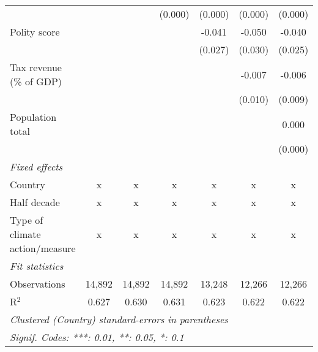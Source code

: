 \begin{tabular}{lcccccc}
                                                                          &              &               & (0.000)        & (0.000)        & (0.000)        & (0.000)\\   
   Polity score                                                           &              &               &                & -0.041         & -0.050         & -0.040\\   
                                                                          &              &               &                & (0.027)        & (0.030)        & (0.025)\\   
   Tax revenue (\% of GDP)                                                &              &               &                &                & -0.007         & -0.006\\   
                                                                          &              &               &                &                & (0.010)        & (0.009)\\   
   Population total                                                       &              &               &                &                &                & 0.000\\   
                                                                          &              &               &                &                &                & (0.000)\\   
   \emph{Fixed effects}\\
   Country                                                                & x            & x             & x              & x              & x              & x\\  
   Half decade                                                            & x            & x             & x              & x              & x              & x\\  
   Type of climate action/measure                                         & x            & x             & x              & x              & x              & x\\  
   \midrule \emph{Fit statistics}\\
   Observations                                                           & 14,892       & 14,892        & 14,892         & 13,248         & 12,266         & 12,266\\  
   R$^2$                                                                  & 0.627        & 0.630         & 0.631          & 0.623          & 0.622          & 0.622\\  
   \midrule
   \multicolumn{7}{l}{\emph{Clustered (Country) standard-errors in parentheses}}\\
   \multicolumn{7}{l}{\emph{Signif. Codes: ***: 0.01, **: 0.05, *: 0.1}}\\
\end{tabular}
\par\endgroup


